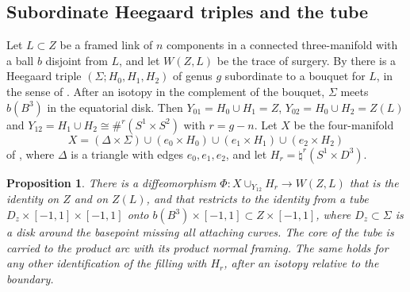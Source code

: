 \documentclass[11pt]{amsart}
\newtheorem{proposition}[theorem]{Proposition}
\theoremstyle{definition}
\theoremstyle{remark}
\theoremstyle{plain}
\numberwithin{equation}{section}
\begin{document}
\subsection{Subordinate Heegaard triples and the tube}\label{subsec:triples}

Let $L\subset Z$ be a framed link of $n$ components in a connected
three-manifold with a ball $b$ disjoint from $L$, and let $W(Z,L)$ be the
trace of surgery. By \cite[Lemma~4.5]{OS-triangles} there is a Heegaard
triple $(\Sigma;H_0,H_1,H_2)$ of genus $g$ subordinate to a bouquet for
$L$, in the sense of \cite[Definition~4.2]{OS-triangles}. After an
isotopy in the complement of the bouquet, $\Sigma$ meets $b(B^3)$ in the
equatorial disk. Then $Y_{01}=H_0\cup H_1=Z$,
$Y_{02}=H_0\cup H_2=Z(L)$ and $Y_{12}=H_1\cup H_2\cong\#^r(S^1\times S^2)$
with $r=g-n$. Let $X$ be the four-manifold
\[
X=(\Delta\times\Sigma)\cup(e_0\times H_0)\cup(e_1\times H_1)\cup
(e_2\times H_2)
\]
of \cite[Section~2.2]{OS-triangles}, where $\Delta$ is a triangle with
edges $e_0,e_1,e_2$, and let
$H_r=\natural^r(S^1\times D^3)$.

\begin{proposition}\label{prop:tube}
There is a diffeomorphism
$\Phi\colon X\cup_{Y_{12}}H_r\to W(Z,L)$ that is the identity on $Z$ and
on $Z(L)$, and that restricts to the identity from a tube
$D_z\times[-1,1]\times[-1,1]$ onto $b(B^3)\times[-1,1]\subset
Z\times[-1,1]$, where $D_z\subset\Sigma$ is a disk around the basepoint
missing all attaching curves. The core of the tube is carried to the
product arc with its product normal framing. The same holds for any
other identification of the filling with $H_r$, after an isotopy
relative to the boundary.
\end{proposition}
\end{document}
